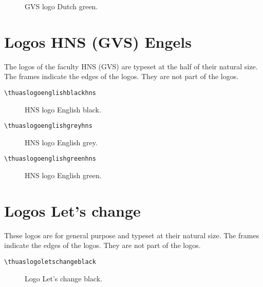 \documentclass[a4paper,12pt]{article}
\begin{document}
\begin{figure}[H]
\centering\fboxsep=0pt%
\fbox{%
\scalebox{0.7071}{\thuaslogodutchgreengvs}}
\caption{GVS logo Dutch green.}
\end{figure}


\section{Logos HNS (GVS) Engels}
The logos of the faculty HNS (GVS) are typeset at the half of their natural size.
The frames indicate the edges of the logos. They are not part of the logos.

\begin{verbatim}
\thuaslogoenglishblackhns
\end{verbatim}

\begin{figure}[H]
\centering\fboxsep=0pt%
\fbox{%
\scalebox{0.7071}{\thuaslogoenglishblackhns}}
\caption{HNS logo English black.}
\end{figure}

\begin{verbatim}
\thuaslogoenglishgreyhns
\end{verbatim}

\begin{figure}[H]
\centering\fboxsep=0pt%
\fbox{%
\scalebox{0.7071}{\thuaslogoenglishgreyhns}}
\caption{HNS logo English grey.}
\end{figure}

\begin{verbatim}
\thuaslogoenglishgreenhns
\end{verbatim}

\begin{figure}[H]
\centering\fboxsep=0pt%
\fbox{%
\scalebox{0.7071}{\thuaslogoenglishgreenhns}}
\caption{HNS logo English green.}
\end{figure}


\section{Logos Let's change}
These logos are for general purpose and typeset at their natural size.
The frames indicate the edges of the logos. They are not part of the logos.

\begin{verbatim}
\thuaslogoletschangeblack
\end{verbatim}

\begin{figure}[H]
\centering\fboxsep=0pt%
\fbox{%
\thuaslogoletschangeblack}
\caption{Logo Let's change black.}
\end{figure}
\end{document}
